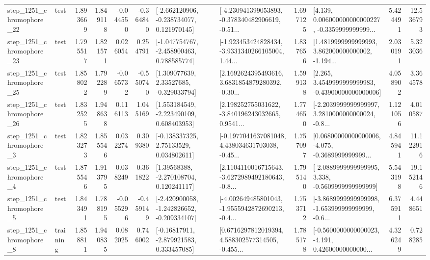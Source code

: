\begin{tabular}{llrrrrllrlrr}
 step\_1251\_chromophore\_22 &      test &      1.893669 &    1.849118 &     -0.044550 & -0.364840 &   [-2.662120906, -0.238734077, 0.121970145] &  [-4.230941399053893, -0.378340482906619, -0.51... &       1.697125 &  [4.139, 0.006000000000000227, -0.3359999999999... &            5.424491 &         12.536793 \\
 step\_1251\_chromophore\_23 &      test &      1.795517 &    1.821571 &      0.026054 &  0.254791 &   [-1.047754767, -2.458900463, 0.788585774] &  [-1.923453424828434, -3.9331340266105004, 1.44... &       1.837656 &  [1.4819999999999993, 3.862000000000002, -1.194... &            2.030191 &          5.323036 \\
 step\_1251\_chromophore\_25 &      test &      1.858022 &    1.792289 &     -0.065732 & -0.550740 &     [1.309077639, 2.33527685, -0.329033794] &  [2.1692624395493616, 3.6831854879280392, -0.30... &       1.599138 &  [2.265, 3.4549999999999983, -0.43900000000000006] &            4.058902 &          3.364578 \\
 step\_1251\_chromophore\_26 &      test &      1.832525 &    1.948638 &      0.116113 &  1.045169 &    [1.553184549, -2.223490109, 0.608403953] &  [2.198252755031622, -3.840196243032665, 0.9541... &       1.774650 &  [-2.2039999999999997, 3.2810000000000024, -0.8... &            1.121056 &          4.010587 \\
  step\_1251\_chromophore\_3 &      test &      1.823273 &    1.855546 &      0.032274 &  0.309380 &     [-0.138337325, 2.75133529, 0.034802611] &  [-0.1977041637081048, 4.438034631703038, -0.45... &       1.757097 &  [0.06800000000000006, -4.075, -0.3689999999999... &            4.845941 &         11.122916 \\
  step\_1251\_chromophore\_4 &      test &      1.875546 &    1.913795 &      0.038249 &  0.361822 &     [1.39568388, -2.270108704, 0.120241117] &  [2.1104110016715643, -3.6272989492180643, -0.8... &       1.795140 &  [-2.0889999999999995, 3.338, -0.5609999999999999] &            5.543198 &         19.152146 \\
  step\_1251\_chromophore\_5 &      test &      1.843491 &    1.788195 &     -0.055296 & -0.459149 &  [-2.420900058, -1.242826652, -0.209334107] &  [-4.002649485801043, -1.9555942872690213, -0.4... &       1.753712 &  [-3.8689999999999998, -1.653999999999999, -0.6... &            6.375911 &          4.448651 \\
  step\_1251\_chromophore\_8 &  training &      1.858811 &    1.940835 &      0.082025 &  0.746002 &    [-0.16817911, -2.879921583, 0.333457085] &  [0.6716297812019394, 4.588302577314505, -0.455... &       1.785178 &  [-0.5600000000000023, -4.191, 0.42600000000000... &            4.326249 &          0.728285 \\

\end{tabular}
